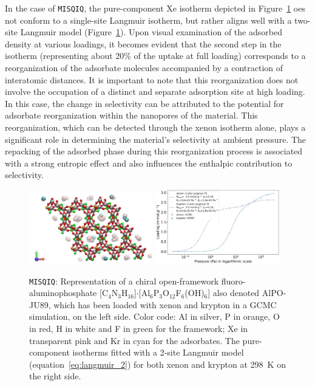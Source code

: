 \documentclass[main.tex]{subfiles}
\begin{document}
In the case of \texttt{MISQIQ}, the pure-component Xe isotherm depicted in Figure~\ref{fgr:MISQIQ} oes not conform to a single-site Langmuir isotherm, but rather aligns well with a two-site Langmuir model (Figure~\ref{fgr:MISQIQ}). Upon visual examination of the adsorbed density at various loadings, it becomes evident that the second step in the isotherm (representing about {20\%} of the uptake at full loading) corresponds to a reorganization of the adsorbate molecules accompanied by a contraction of interatomic distances. It is important to note that this reorganization does not involve the occupation of a distinct and separate adsorption site at high loading. In this case, the change in selectivity can be attributed to the potential for adsorbate reorganization within the nanopores of the material. This reorganization, which can be detected through the xenon isotherm alone, plays a significant role in determining the material's selectivity at ambient pressure. The repacking of the adsorbed phase during this reorganization process is associated with a strong entropic effect and also influences the enthalpic contribution to selectivity.

\begin{figure}[t]
  \centering
    \includegraphics[width=0.48\textwidth]{figures/2-thermo/MISQIQ_clean.jpg}\hfill
    \includegraphics[width=0.48\textwidth]{figures/2-thermo/MISQIQ_clean_isotherm_xenon_krypton_298K.jpg}
    \caption{\texttt{MISQIQ}: Representation of a chiral open-framework fluoro-aluminophosphate [C$_4$N$_3$H$_{16}$]$\cdot$[Al$_6$P$_3$O$_{12}$F$_6$(OH)$_6$] also denoted AlPO-JU89, which has been loaded with xenon and krypton in a GCMC simulation, on the left side.\autocite{MISQIQ} Color code: Al in silver, P in orange, O in red, H in white and F in green for the framework; Xe in transparent pink and Kr in cyan for the adsorbates. The pure-component isotherms fitted with a 2-site Langmuir model (equation~\ref{eq:langmuir_2}) for both xenon and krypton at \SI{298}{\kelvin} on the right side.}\label{fgr:MISQIQ}
  \end{figure}
\end{document}

